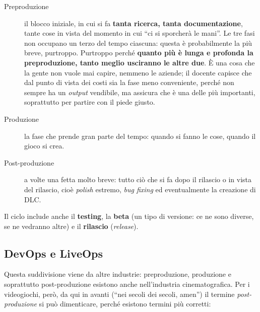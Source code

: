 \begin{description}
  \item[Preproduzione] il blocco iniziale, in cui si fa \textbf{tanta ricerca,
        tanta documentazione}, tante cose in vista del momento in cui ``ci si
        sporcherà le mani''. Le tre fasi non occupano un terzo del tempo
        ciascuna: questa è probabilmente la più breve, purtroppo. Purtroppo
        perché \textbf{quanto più è lunga e profonda la preproduzione, tanto
        meglio usciranno le altre due}. È una cosa che la gente non vuole mai
        capire, nemmeno le aziende; il docente capisce che dal punto di vista
        dei costi sia la fase meno conveniente, perché non sempre ha un
        \emph{output} vendibile, ma assicura che è una delle più importanti,
        soprattutto per partire con il piede giusto.
  \item[Produzione] la fase che prende gran parte del tempo: quando si fanno
        le cose, quando il gioco si crea.
  \item[Post-produzione] a volte una fetta molto breve: tutto ciò che si fa
        dopo il rilascio o in vista del rilascio, cioè \emph{polish} estremo,
        \emph{bug fixing} ed eventualmente la creazione di DLC.
\end{description}

Il ciclo include anche il \textbf{testing}, la \textbf{beta} (un tipo di
versione: ce ne sono diverse, se ne vedranno altre) e il \textbf{rilascio}
(\emph{release}).

\subsection{DevOps e LiveOps}



Questa suddivisione viene da altre industrie: preproduzione, produzione e
soprattutto post-produzione esistono anche nell'industria cinematografica. Per
i videogiochi, però, da qui in avanti (``nei secoli dei secoli, amen'') il
termine \emph{post-produzione} si può dimenticare, perché esistono termini
più corretti:

